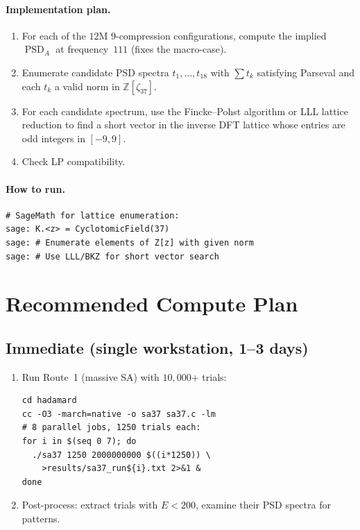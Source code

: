 \documentclass[11pt,a4paper]{article}
\newcommand{\Z}{\mathbb{Z}}
\newcommand{\PSD}{\operatorname{PSD}}
\theoremstyle{plain}
\theoremstyle{definition}
\theoremstyle{remark}
\begin{document}
\paragraph{Implementation plan.}
\begin{enumerate}
\item For each of the $12$M $9$-compression configurations, compute the implied $\PSD_A$ at frequency~$111$ (fixes the macro-case).
\item Enumerate candidate PSD spectra $t_1,\dots,t_{18}$ with $\sum t_k$ satisfying Parseval and each $t_k$ a valid norm in $\Z[\zeta_{37}]$.
\item For each candidate spectrum, use the Fincke--Pohst algorithm or LLL lattice reduction to find a short vector in the inverse DFT lattice whose entries are odd integers in $[-9,9]$.
\item Check LP compatibility.
\end{enumerate}

\paragraph{How to run.}
\begin{lstlisting}
# SageMath for lattice enumeration:
sage: K.<z> = CyclotomicField(37)
sage: # Enumerate elements of Z[z] with given norm
sage: # Use LLL/BKZ for short vector search
\end{lstlisting}

\section{Recommended Compute Plan}

\subsection{Immediate (single workstation, 1--3 days)}
\begin{enumerate}
\item Run Route~1 (massive SA) with $10{,}000$+ trials:
\begin{lstlisting}
cd hadamard
cc -O3 -march=native -o sa37 sa37.c -lm
# 8 parallel jobs, 1250 trials each:
for i in $(seq 0 7); do
  ./sa37 1250 2000000000 $((i*1250)) \
    >results/sa37_run${i}.txt 2>&1 &
done
\end{lstlisting}
\item Post-process: extract trials with $E<200$, examine their PSD spectra for patterns.
\end{enumerate}
\end{document}
